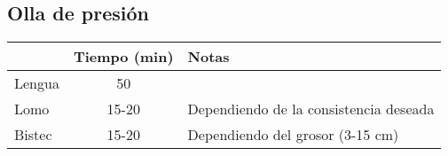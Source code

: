 \subsection{Olla de presi\'on}

\begin{table}[H]
  \begin{tabular}{l | c | l}
    & Tiempo (min) & Notas \\
    \hline
    Lengua     & 50 &  \\
    Lomo    & 15-20  & Dependiendo de la consistencia deseada \\
    Bistec        & 15-20  & Dependiendo del grosor (3-15 cm)
  \end{tabular}
  \end{table}
